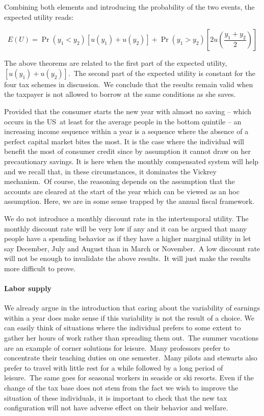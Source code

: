 Combining both elements and introducing the probability of the two events, the
expected utility reads:%

\[
E(U)=\Pr(y_{1}<y_{2})[u(y_{1})+u(y_{2})]+\Pr(y_{1}>y_{2})[2u(\frac{y_{1}%
+y_{2}}{2})]
\]


The above theorems are related to the first part of the expected utility,
$[u(y_{1})+u(y_{2})]$.\ The second part of the expected utility is constant
for the four tax schemes in discussion.\ We conclude that the results remain
valid when the taxpayer is not allowed to borrow at the same conditions as she saves.

Provided that the consumer starts the new year with almost no saving -- which
occurs in the US\ at least for the average people in the bottom quintile -- an
increasing income sequence within a year is a sequence where the absence of a
perfect capital market bites the most. It is the case where the individual
will benefit the most of consumer credit since by assumption it cannot draw on
her precautionary savings. It is here when the monthly compensated system will
help and we recall that, in these circumstances, it dominates the Vickrey
mechanism.\ Of course, the reasoning depends on the assumption that the
accounts are cleared at the start of the year which can be viewed as an hoc
assumption. Here, we are in some sense trapped by the annual fiscal framework.

We do not introduce a monthly discount rate in the intertemporal utility. The
monthly discount rate will be very low if any and it can be argued that many
people have a spending behavior as if they have a higher marginal utility in
let say December, July and August than in March or November.\ A low discount
rate will not be enough to invalidate the above results.\ It will just make
the results more difficult to prove.

\paragraph{Labor supply}

We already argue in the introduction that caring about the variability of
earnings within a year does make sense if this variability is not the result
of a choice. We can easily think of situations where the individual prefers to
some extent to gather her hours of work rather than spreading them out.\ The
summer vacations are an example of corner solutions for leisure.\ Many
professors prefer to concentrate their teaching duties on one semester.\ Many
pilots and stewarts also prefer to travel with little rest for a while
followed by a long period of leisure.\ The same goes for seasonal workers in
seaside or ski resorts. Even if the change of the tax base does not stem from
the fact we wish to improve the situation of these individuals, it is
important to check that the new tax configuration will not have adverse effect
on their behavior and welfare.

